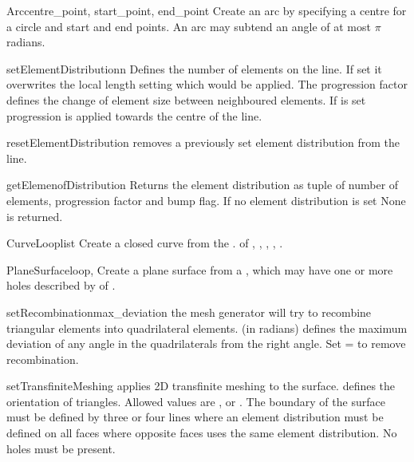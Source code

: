 \begin{classdesc}{Arc}{centre_point, start_point, end_point}
Create an arc by specifying a centre for a circle and start and end points. An arc may subtend an angle of at most $\pi$ radians.
\end{classdesc}
\begin{methoddesc}[Arc]{setElementDistribution}{n}
Defines the number of elements on the line. If set it overwrites the local length setting which would be applied. The progression factor  defines the change of element size between neighboured elements. If  is set
progression is applied towards the centre of the line.
\end{methoddesc}
\begin{methoddesc}[Arc]{resetElementDistribution}{}
removes a previously set element distribution from the line.
\end{methoddesc}
\begin{methoddesc}[Arc]{getElemenofDistribution}{}
Returns the element distribution as tuple of
number of elements, progression factor and bump flag. If
no element distribution is set None is returned.
\end{methoddesc}

\begin{classdesc}{CurveLoop}{list}
Create a closed curve from the . of
, , , ,
.
\end{classdesc}

\begin{classdesc}{PlaneSurface}{loop, }
Create a plane surface from a , which may have one or more holes
described by  of .
\end{classdesc}
\begin{methoddesc}[PlaneSurface]{setRecombination}{max_deviation}
the mesh generator will try to recombine triangular elements 
into quadrilateral elements.  (in radians) defines the
maximum deviation of any angle in the quadrilaterals from the right angle.  
Set = to remove recombination.
\end{methoddesc}
\begin{methoddesc}[PlaneSurface]{setTransfiniteMeshing}{}
applies 2D transfinite meshing to the surface. 
 defines the orientation of triangles. Allowed values
are ,  or . The 
boundary of the surface must be defined by three or four lines where an
element distribution must be defined on all faces where opposite 
faces uses the same element distribution. No holes must be present.
\end{methoddesc}



